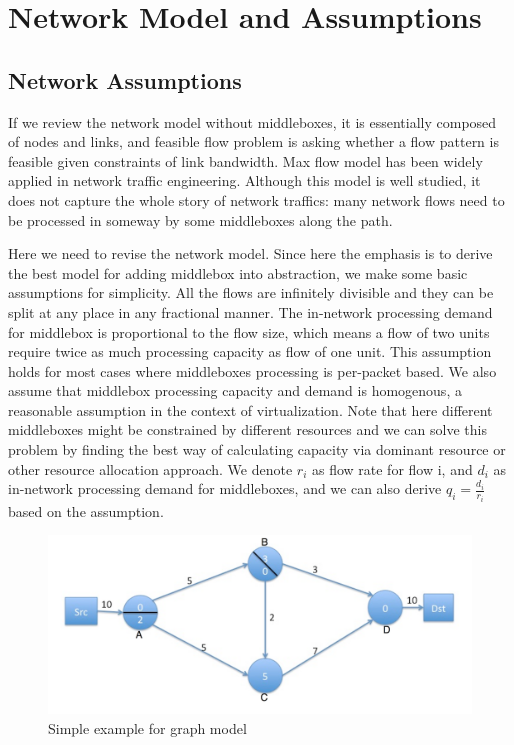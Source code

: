 \documentclass{sig-alternate}
\begin{document}
\section{Network Model and Assumptions}
\subsection{Network Assumptions}
If we review the network model without middleboxes, it is essentially composed of nodes and links, and feasible flow problem is asking whether a flow pattern is feasible given constraints of link bandwidth. Max flow model\cite{FordFulkerson, Edmonds1972} has been widely applied in network traffic engineering. Although this model is well studied, it does not capture the whole story of network traffics: many network flows need to be processed in someway by some middleboxes along the path. 

Here we need to revise the network model. Since here the emphasis is to derive the best model for adding middlebox into abstraction, we make some basic assumptions for simplicity. All the flows are infinitely divisible and they can be split at any place in any fractional manner. The in-network processing demand for middlebox is proportional to the flow size, which means a flow of two units require twice as much processing capacity as flow of one unit. This assumption holds for most cases where middleboxes processing is per-packet based. We also assume that middlebox processing capacity and demand is homogenous, a reasonable assumption in the context of virtualization. Note that here different middleboxes might be constrained by different resources and we can solve this problem by finding the best way of calculating capacity via dominant resource or other resource allocation approach. We denote $r_i$ as flow rate for flow i, and $d_i$ as in-network processing demand for middleboxes, and we can also derive $q_i = \frac{d_i}{r_i}$ based on the assumption. 

\begin{figure}
\includegraphics[scale=0.19]{demo.png} 
\caption{Simple example for graph model \label{figure}}
 \end{figure}
 
\end{document}
